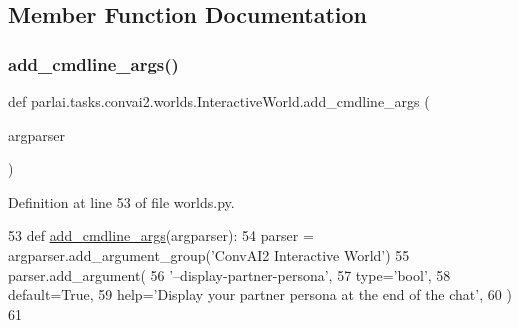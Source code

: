 \subsection{Member Function Documentation}
\mbox{\label{classparlai_1_1tasks_1_1convai2_1_1worlds_1_1InteractiveWorld_abcbca63c63937e6399a1ab29cd425274}} 
\subsubsection{\texorpdfstring{add\+\_\+cmdline\+\_\+args()}{add\_cmdline\_args()}}
{\footnotesize\ttfamily def parlai.\+tasks.\+convai2.\+worlds.\+Interactive\+World.\+add\+\_\+cmdline\+\_\+args (\begin{DoxyParamCaption}\item[{}]{argparser }\end{DoxyParamCaption})\hspace{0.3cm}{\ttfamily [static]}}



Definition at line 53 of file worlds.\+py.


\begin{DoxyCode}
53     \textcolor{keyword}{def }\hyperlink{namespaceparlai_1_1agents_1_1drqa_1_1config_a62fdd5554f1da6be0cba185271058320}{add\_cmdline\_args}(argparser):
54         parser = argparser.add\_argument\_group(\textcolor{stringliteral}{'ConvAI2 Interactive World'})
55         parser.add\_argument(
56             \textcolor{stringliteral}{'--display-partner-persona'},
57             type=\textcolor{stringliteral}{'bool'},
58             default=\textcolor{keyword}{True},
59             help=\textcolor{stringliteral}{'Display your partner persona at the end of the chat'},
60         )
61 
\end{DoxyCode}
\mbox{\label{classparlai_1_1tasks_1_1convai2_1_1worlds_1_1InteractiveWorld_acac91ca0d5cfc546437874e2f6d801a3}} 
